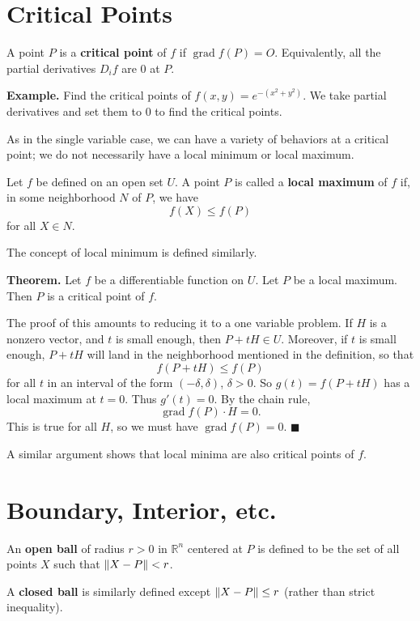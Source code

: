 \documentclass{article}
\DeclareMathOperator{\grd}{grad}
\begin{document}
\section*{Critical Points}

A point $P$ is a \textbf{critical point} of $f$ if $\grd f (P) = O$. 
Equivalently, all the partial derivatives $D_i f$ are $0$ at $P$.

\textbf{Example.} 
Find the critical points of $f(x,y) = e^{-(x^2+y^2)}$. We take 
partial derivatives and set them to $0$ to find the critical points.

As in the single variable case, we can have a variety of 
behaviors at a critical point; we do not necessarily have
a local minimum or local maximum.

Let $f$ be defined on an open set $U$. A point $P$ is called a
\textbf{local maximum} of $f$ if, in some
neighborhood $N$ of $P$, we have 
\[f(X) \leq f(P)\]
for all $X \in N$.

The concept of local minimum is defined similarly. 

\textbf{Theorem.} Let $f$ be a differentiable function on $U$.
Let $P$ be a local maximum. Then $P$ is a critical point of $f$.

The proof of this amounts to reducing it to a one variable problem.
If $H$ is a nonzero vector, and $t$ is small enough, then 
$P + tH \in U$. Moreover, if $t$ is small enough, $P+tH$ will land
in the neighborhood mentioned in the definition, so that
\[f(P+tH) \leq f(P)\]
for all $t$ in an interval of the form $(-\delta, \delta)$, $\delta > 0$.
So $g(t) = f(P+tH)$ has a local maximum at $t=0$. Thus $g'(t)=0$. 
By the chain rule, 
\[\grd f (P) \cdot H = 0.\]
This is true for all $H$, so we must have $\grd f (P) = 0$. $\blacksquare$

A similar argument shows that local minima are also critical points 
of $f$.

\section*{Boundary, Interior, etc.}

An \textbf{open ball} of radius $r>0$ in $\mathbb{R}^n$ centered at $P$ is defined to be 
the set of all points $X$ such that $\norm{X-P} < r$. 

A \textbf{closed ball} is similarly defined except $\norm{X-P} \leq r$ (rather than strict inequality).
\end{document}
